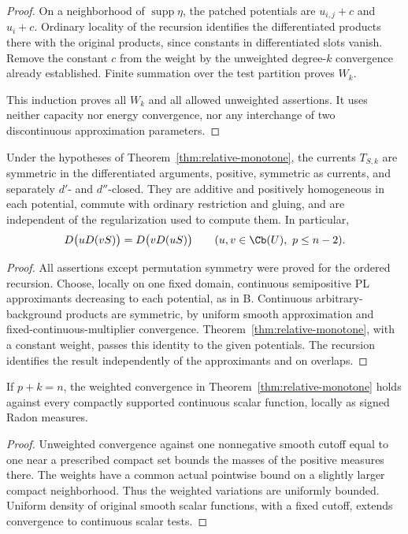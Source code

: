 \begin{proof}
On a neighborhood of $\operatorname{supp}\eta$, the patched potentials
are $u_{i,j}+c$ and $u_i+c$. Ordinary locality of the recursion identifies
the differentiated products there with the original products, since
constants in differentiated slots vanish. Remove the constant $c$ from
the weight by the unweighted degree-$k$ convergence already established.
Finite summation over the test partition proves $W_k$.

This induction proves all $W_k$ and all allowed unweighted assertions.
It uses neither capacity nor energy convergence, nor any interchange
of two discontinuous approximation parameters.
\end{proof}

\begin{corollary}
\label{cor:full-calculus}
Under the hypotheses of Theorem~\ref{thm:relative-monotone}, the currents
$T_{S,k}$ are symmetric in the differentiated arguments,
positive, symmetric as currents, and separately $d'$- and $d''$-closed.
They are additive and positively homogeneous in each potential, commute
with ordinary restriction and gluing, and are independent of the
regularization used to compute them. In particular,
\[
 D\bigl(uD(vS)\bigr)=D\bigl(vD(uS)\bigr)
 \qquad(u,v\in\Cb(U),\ p\leq n-2).
\]
\end{corollary}

\begin{proof}
All assertions except permutation symmetry were proved for the ordered
recursion. Choose, locally on one fixed domain, continuous semipositive
PL approximants decreasing to each potential, as in \textup{B}.
Continuous arbitrary-background products are symmetric, by uniform
smooth approximation and fixed-continuous-multiplier convergence.
Theorem~\ref{thm:relative-monotone}, with a constant weight, passes this
identity to the given potentials. The recursion identifies the result
independently of the approximants and on overlaps.
\end{proof}

\begin{corollary}
\label{cor:top-measures}
If $p+k=n$, the weighted convergence in
Theorem~\ref{thm:relative-monotone} holds against every compactly
supported continuous scalar function, locally as signed Radon measures.
\end{corollary}

\begin{proof}
Unweighted convergence against one nonnegative smooth cutoff equal to
one near a prescribed compact set bounds the masses of the positive
measures there. The weights have a common actual pointwise bound on a
slightly larger compact neighborhood. Thus the weighted variations are
uniformly bounded. Uniform density of original smooth scalar functions,
with a fixed cutoff, extends convergence to continuous scalar tests.
\end{proof}

